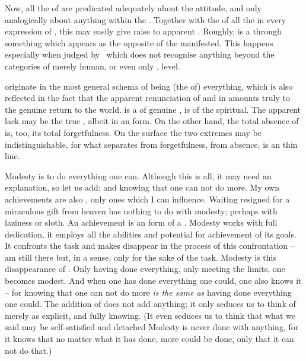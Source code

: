 \pa Now, all the  of  are predicated
adequately about the  attitude, and only analogically about
anything within the . Together with the  of all the 
 in every expression of , this may easily give
raise to apparent . Roughly,  is a 
through something which appears as the opposite of the manifested. This happens
especially when judged by \No\ which does not recognise anything beyond the
 categories of merely human, or even only , level.

 originate in the most general schema of  being
(the  of) everything, which is also reflected in the fact that the
apparent renunciation of  and  in 
amounts truly to the genuine return to the world.   is a  of
genuine ,  is  of the
spiritual.  %
The apparent lack may be the true , albeit
in an  form.  On the other hand, the total absence of 
is, too, its total forgetfulness. On the surface the two extremes may be
indistinguishable, for what separates  from forgetfulness,
 from absence, is an  thin line.

\pa Modesty is to do everything one can. Although this is all, it may need an
explanation, so let us add: and knowing that one can not do more.  My own
achievements are also , only ones which I can influence. Waiting
resigned for a miraculous gift from heaven has nothing to do with modesty;
perhaps with laziness or sloth. An achievement is an  form
of a .  Modesty works with full dedication, it employs all the abilities
and potential for achievement of its goals. It confronts the task and makes  disappear in
the process of this confrontation --  am still there but, in a sense, only
for the sake of the task. Modesty is this disappearance of . Only
having done everything,  
only meeting the limits, one becomes modest. And when one has done
everything one could, one also knows it -- for knowing that one can not do more {\em
  is the same as} having done everything one could. The addition of   does not add anything; it only seduces us to think of
 merely as explicit,  and fully  knowing.
(It even seduces us to think that what we said may be self-satisfied and detached
 Modesty is never done
with anything, for it knows that no matter what it has done, more could be done,
only that it can not do that.)


